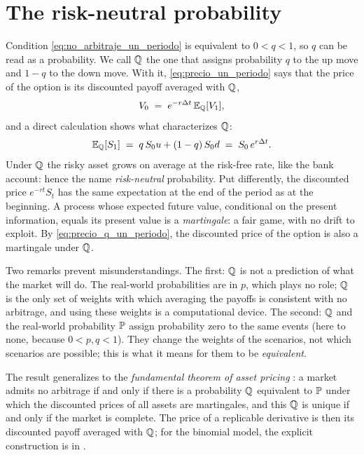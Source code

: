 \section{The risk-neutral probability}\label{sec:neutral_riesgo}

Condition \eqref{eq:no_arbitraje_un_periodo} is equivalent to
$0 < q < 1$, so $q$ can be read as a probability. We call $\mathbb{Q}$ the one
that assigns probability $q$ to the up move and $1 - q$ to the down
move. With it, \eqref{eq:precio_un_periodo} says that the price of the
option is its discounted payoff averaged with $\mathbb{Q}$,
\begin{equation}\label{eq:precio_q_un_periodo}
  V_0 \;=\; e^{-r\Delta t}\, \mathbb{E}_{\mathbb{Q}}[V_1],
\end{equation}
and a direct calculation shows what characterizes $\mathbb{Q}$:
\begin{equation}\label{eq:q_crecimiento_r}
  \mathbb{E}_{\mathbb{Q}}[S_1] \;=\; q\, S_0 u + (1 - q)\, S_0 d \;=\; S_0\, e^{r\Delta t}.
\end{equation}
Under $\mathbb{Q}$ the risky asset grows on average at the risk-free rate, like
the bank account: hence the name \emph{risk-neutral} probability. Put
differently, the discounted price $e^{-rt}S_t$ has the same expectation
at the end of the period as at the beginning. A process whose expected
future value, conditional on the present information, equals its
present value is a \emph{martingale}: a fair game, with no drift to
exploit. By \eqref{eq:precio_q_un_periodo}, the discounted price of the
option is also a martingale under $\mathbb{Q}$.

Two remarks prevent misunderstandings. The first: $\mathbb{Q}$ is not a
prediction of what the market will do. The real-world probabilities are in
$p$, which plays no role; $\mathbb{Q}$ is the only set of weights with which
averaging the payoffs is consistent with no arbitrage, and using these
weights is a computational device. The second: $\mathbb{Q}$ and the real-world probability
$\mathbb{P}$ assign probability zero to the same events (here to none, because
$0 < p, q < 1$). They change the weights of the scenarios, not which
scenarios are possible; this is what it means for them to be
\emph{equivalent}.

The result generalizes to the \emph{fundamental theorem of asset
pricing} \cite[Section~5.4]{shreve}: a market admits no arbitrage if
and only if there is a probability $\mathbb{Q}$ equivalent to $\mathbb{P}$ under which
the discounted prices of all assets are martingales, and this $\mathbb{Q}$ is
unique if and only if the market is complete. The price of a replicable
derivative is then its discounted payoff averaged with $\mathbb{Q}$; for the
binomial model, the explicit construction is in
\cite[Sections~2.2--2.3]{tfgm}.

